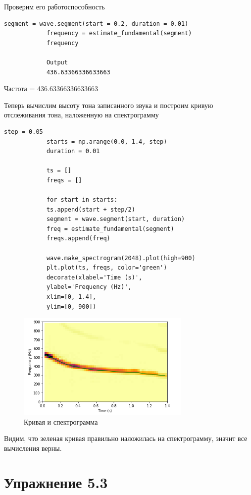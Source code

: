 \documentclass[a4paper,12pt]{article}
\begin{document}
\begin{enumerate}
		Проверим его работоспособность
		\begin{lstlisting}[caption=Вычисление частоты с помощью метода \textit{estimate\_fundamental}]
			segment = wave.segment(start = 0.2, duration = 0.01)
			frequency = estimate_fundamental(segment)
			frequency
			
			Output
			436.63366336633663
		\end{lstlisting}
	
		Частота = 436.63366336633663
		
		Теперь вычислим высоту тона записанного звука и построим кривую отслеживания тона, наложенную на спектрограмму
		\begin{lstlisting}[caption=Вычисление кривой отслеживания тона]
			step = 0.05
			starts = np.arange(0.0, 1.4, step)
			duration = 0.01
			
			ts = []
			freqs = []
			
			for start in starts:
			ts.append(start + step/2)
			segment = wave.segment(start, duration)
			freq = estimate_fundamental(segment)
			freqs.append(freq)
			
			wave.make_spectrogram(2048).plot(high=900)    
			plt.plot(ts, freqs, color='green')
			decorate(xlabel='Time (s)', 
			ylabel='Frequency (Hz)',
			xlim=[0, 1.4],
			ylim=[0, 900])
		\end{lstlisting}
		\begin{figure}[H]
			\centering
			\includegraphics[width=0.75\textwidth]{2_2.png}
			\caption{Кривая и спектрограмма}
			\label{fig:2.2}
		\end{figure}
		Видим, что зеленая кривая правильно наложилась на спектрограмму, значит все вычисления верны.
		
	\end{enumerate}
	\newpage
	
	
	\section{Упражнение 5.3}
	
\end{document}
